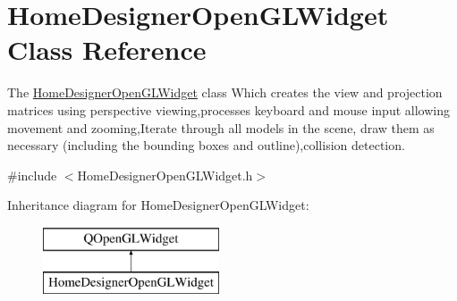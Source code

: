 \hypertarget{class_home_designer_open_g_l_widget}{}\section{Home\+Designer\+Open\+G\+L\+Widget Class Reference}
\label{class_home_designer_open_g_l_widget}


The \hyperlink{class_home_designer_open_g_l_widget}{Home\+Designer\+Open\+G\+L\+Widget} class Which creates the view and projection matrices using perspective viewing,processes keyboard and mouse input allowing movement and zooming,Iterate through all models in the scene, draw them as necessary (including the bounding boxes and outline),collision detection.  




{\ttfamily \#include $<$Home\+Designer\+Open\+G\+L\+Widget.\+h$>$}

Inheritance diagram for Home\+Designer\+Open\+G\+L\+Widget\+:\begin{figure}[H]
\begin{center}
\leavevmode
\includegraphics[height=2.000000cm]{class_home_designer_open_g_l_widget}
\end{center}
\end{figure}

